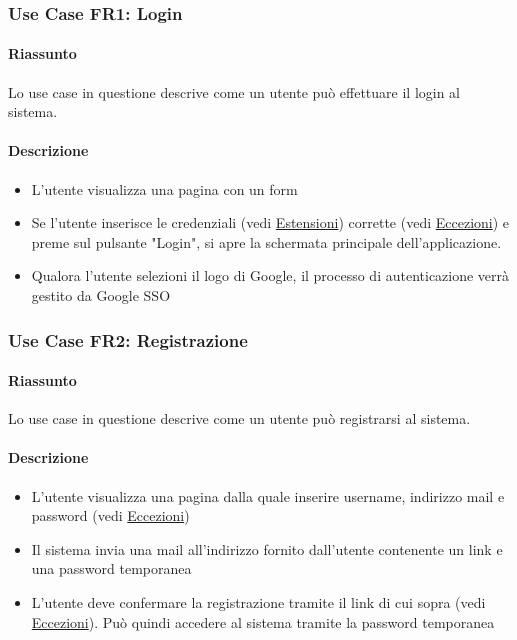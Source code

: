 \documentclass[9pt]{extarticle}
\begin{document}
\subsubsection*{Use Case FR1: Login}

\paragraph{Riassunto}

Lo use case in questione descrive come un utente può effettuare il login al sistema.

\paragraph{Descrizione}

\begin{itemize}
	\item L'utente visualizza una pagina con un form
	\item Se l'utente inserisce le credenziali (vedi  \hyperref[Estensioni-FR2]{Estensioni}) corrette (vedi \hyperref[Eccezioni-FR2]{Eccezioni}) e preme sul pulsante "Login", si apre la schermata principale dell'applicazione.
	\item Qualora l'utente selezioni il logo di Google, il processo di autenticazione verrà gestito da Google SSO
\end{itemize}

\subsubsection*{Use Case FR2: Registrazione}

\paragraph{Riassunto}

Lo use case in questione descrive come un utente può registrarsi al sistema.

\paragraph{Descrizione}

\begin{itemize}
	\item L'utente visualizza una pagina dalla quale inserire username, indirizzo mail e password (vedi \hyperref[Eccezioni-FR2]{Eccezioni})
	\item Il sistema invia una mail all'indirizzo fornito dall'utente contenente un link e una password temporanea
	\item L'utente deve confermare la registrazione tramite il link di cui sopra (vedi \hyperref[Eccezioni-FR2]{Eccezioni}). Può quindi accedere al sistema tramite la password temporanea
\end{itemize}
\end{document}
